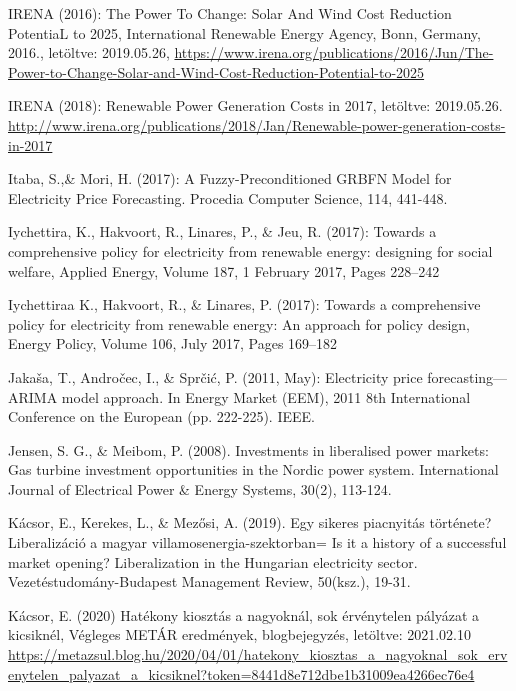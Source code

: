 \documentclass[twoside, magyar, showtrims]{corvinusphd}
\begin{document}
\begin{thebibliography}{99}
IRENA (2016): The Power To Change: Solar And Wind Cost Reduction PotentiaL to 2025, International Renewable Energy Agency, Bonn, Germany, 2016., letöltve: 2019.05.26,
\url{https://www.irena.org/publications/2016/Jun/The-Power-to-Change-Solar-and-Wind-Cost-Reduction-Potential-to-2025}

IRENA (2018): Renewable Power Generation Costs in 2017, letöltve: 2019.05.26.
\url{http://www.irena.org/publications/2018/Jan/Renewable-power-generation-costs-in-2017}

Itaba, S.,\& Mori, H. (2017): A Fuzzy-Preconditioned GRBFN Model for Electricity Price Forecasting. Procedia Computer Science, 114, 441-448.

Iychettira, K., Hakvoort, R., Linares, P., \& Jeu, R. (2017): Towards a comprehensive policy for electricity from renewable energy: designing for social welfare, Applied Energy, Volume 187, 1 February 2017, Pages 228–242

Iychettiraa K., Hakvoort, R., \& Linares, P. (2017): Towards a comprehensive policy for electricity from renewable energy: An approach for policy design, Energy Policy, Volume 106, July 2017, Pages 169–182

Jakaša, T., Andročec, I., \& Sprčić, P. (2011, May): Electricity price forecasting—ARIMA model approach. In Energy Market (EEM), 2011 8th International Conference on the European (pp. 222-225). IEEE.

Jensen, S. G., \& Meibom, P. (2008). Investments in liberalised power markets: Gas turbine investment opportunities in the Nordic power system. International Journal of Electrical Power \& Energy Systems, 30(2), 113-124.

Kácsor, E., Kerekes, L., \& Mezősi, A. (2019). Egy sikeres piacnyitás története? Liberalizáció a magyar villamosenergia-szektorban= Is it a history of a successful market opening? Liberalization in the Hungarian electricity sector. Vezetéstudomány-Budapest Management Review, 50(ksz.), 19-31.

Kácsor, E. (2020) Hatékony kiosztás a nagyoknál, sok érvénytelen pályázat a kicsiknél, Végleges METÁR eredmények, blogbejegyzés, letöltve: 2021.02.10
\url{https://metazsul.blog.hu/2020/04/01/hatekony\_kiosztas\_a\_nagyoknal\_sok\_ervenytelen\_palyazat\_a\_kicsiknel?token=8441d8e712dbe1b31009ea4266ec76e4}


\end{thebibliography}
\end{document}
